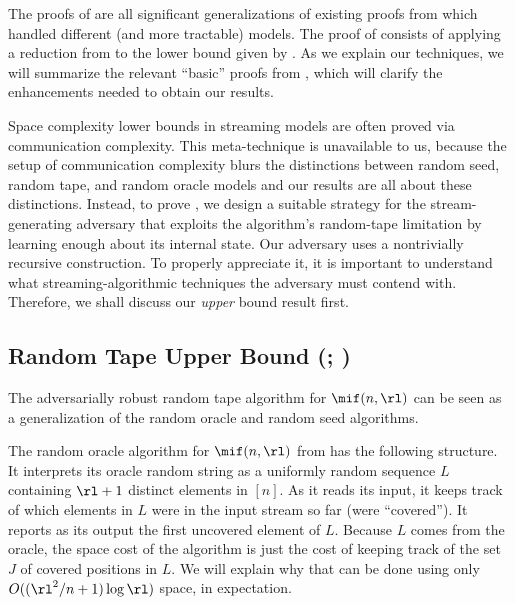 \begin{itemize}
\begin{itemize}
The proofs of  are all significant
generalizations of existing proofs from \cite{Stoeckl23} which handled
different (and more tractable) models. The proof of  consists
of applying a reduction from \cite{Stoeckl23} to the lower bound given by
. As we explain our techniques, we will summarize the relevant
``basic'' proofs from \cite{Stoeckl23}, which will clarify the enhancements
needed to obtain our results.  

Space complexity lower bounds in streaming models are often proved via
communication complexity. This meta-technique is unavailable to us, because
the setup of communication complexity blurs the distinctions between random
seed, random tape, and random oracle models and our results are all about
these distinctions. Instead, to prove , we design a suitable
strategy for the stream-generating adversary that exploits the algorithm's
random-tape limitation by learning enough about its internal state. Our
adversary uses a nontrivially recursive construction.  To properly appreciate
it, it is important to understand what streaming-algorithmic techniques the
adversary must contend with.  Therefore, we shall discuss our {\em upper}
bound result first.

\subsection{Random Tape Upper Bound\texorpdfstring{ (; )}{}}\label{subsec:rt-ub-overview}

The adversarially robust random tape algorithm for $\mif(n,\rl)$ can be seen as a
generalization of the random oracle and random seed algorithms.

 The random
oracle algorithm for $\mif(n,\rl)$ from \cite{Stoeckl23} has the following structure. It interprets
its oracle random string as a uniformly random sequence $L$ containing $\rl +
1$ distinct elements in $[n]$. As it reads its input, it keeps track of which
elements in $L$ were in the input stream so far (were ``covered''). It reports
as its output the first uncovered element of $L$.  Because $L$ comes from the
oracle, the space cost of the algorithm is just the cost of keeping track of
the set $J$ of covered positions in $L$. We will explain why that can be done
using only $O((\rl^2/n + 1) \log \rl)$ space, in expectation.


\end{itemize}
\end{itemize}
